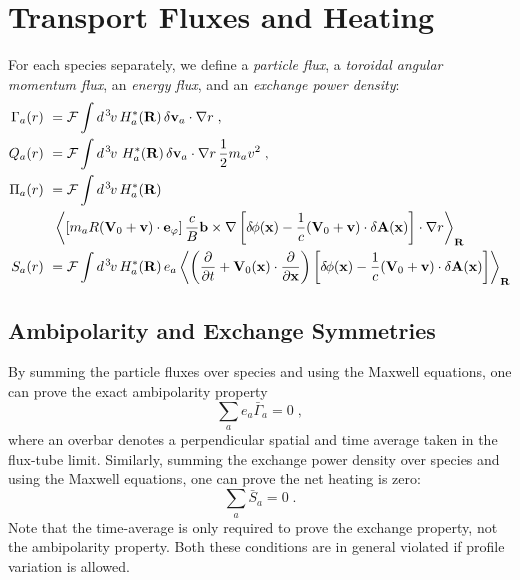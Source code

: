 \section{Transport Fluxes and Heating}

For each species separately, we define a {\it particle flux}, 
a {\it toroidal angular momentum flux}, an {\it energy flux}, 
and an {\it exchange power density}:
%
\begin{align}
\Gamma_a(r) &~= {\cal F} \int d^{\hskip 1pt 3} \hskip -1pt v \, H_a^*(\mathbf{R}) \, 
  \delta {\bf v}_a \cdot\nabla r \; , \\
Q_a(r) &~= {\cal F} \int d^{\hskip 1pt 3} \hskip -1pt v \, \, H_a^*(\mathbf{R}) \, 
  \delta {\bf v}_a\cdot\nabla r \, \frac{1}{2} m_a v^2 \; , \\
\Pi_a(r) &~= {\cal F} \int d^{\hskip 1pt 3} \hskip -1pt v \, H_a^*(\mathbf{R}) \nonumber \\
&~~\left< \left[ m_a R ( {\bf V}_0 + \mathbf{v} ) \cdot {\bf e}_\varphi \right] 
  \frac{c}{B} \mathbf{b} \times \nabla \left[ 
  \delta \hskip -1pt \phi({\bf x})-\frac{1}{c}({\bf V}_0 + \mathbf{v}) \cdot 
\delta {\bf A}({\bf x}) \right] \cdot \nabla r \right>_{\mathbf{R}} \\
S_a(r) &~= {\cal F} \int d^{\hskip 1pt 3} \hskip -1pt v \, H_a^*(\mathbf{R}) \, e_a 
\left< \left( \frac{\partial}{\partial t} + {\bf V}_0({\bf x}) 
\cdot \frac{\partial}{\partial{\bf x}} \right)  
\left[ \delta \hskip -1pt \phi({\bf x})-\frac{1}{c}({\bf V}_0 + \mathbf{v}) \cdot 
\delta {\bf A}({\bf x}) \right] \right>_{\mathbf{R}}
\end{align}

\subsection{Ambipolarity and Exchange Symmetries}

By summing the particle fluxes over species and using the Maxwell 
equations, one can prove the exact ambipolarity property
%
\begin{equation}
\sum_a e_a {\bar \Gamma}_a = 0 \; ,
\end{equation}
%
where an overbar denotes a perpendicular spatial and time average 
taken in the flux-tube limit.  Similarly, summing the exchange power 
density over species and using the Maxwell equations, one can prove
the net heating is zero:
%
\begin{equation}
\sum_a {\bar S}_a = 0 \; .
\end{equation}
%
Note that the time-average is only required to prove the exchange 
property, not the ambipolarity property.  Both these conditions are 
in general violated if profile variation is allowed.

